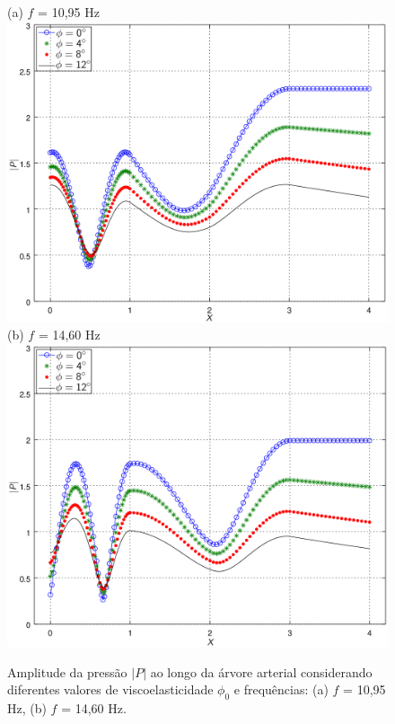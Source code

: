 \documentclass[a4paper,12pt]{monografia}
\theoremstyle{plain}
\theoremstyle{definition}
\theoremstyle{remark}
\begin{document}
\begin{figure}[!htbp]
	\centering
	(a) $f$ = 10,95 Hz\\
	\includegraphics[scale=0.7]{figure4-result-new/fig4_P_f10_95_visco_new2.png}\\
	(b) $f$ = 14,60 Hz\\
	\includegraphics[scale=0.7]{figure4-result-new/fig4_P_f14_60_visco_new2.png}\\
	\caption{Amplitude da pressão $|P|$ ao longo da árvore arterial considerando diferentes valores de viscoelasticidade $\phi_0$ e frequências: (a) $f$ = 10,95 Hz, (b) $f$ = 14,60 Hz.}
	\label{fig4b:arterial-tree}%
\end{figure}
\end{document}
